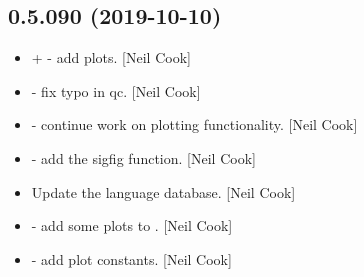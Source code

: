 \documentclass[a4paper,10pt,english]{report}
\begin{document}
\subsection{0.5.090 (2019-10-10)}
\label{\detokenize{misc/changelog:id53}}\begin{itemize}
\item {} 
 +  -
add plots. {[}Neil Cook{]}

\item {} 
 - fix typo in qc. {[}Neil Cook{]}

\item {} 
 - continue work on plotting functionality. {[}Neil Cook{]}

\item {} 
 - add the sigfig function. {[}Neil Cook{]}

\item {} 
Update the language database. {[}Neil Cook{]}

\item {} 
 - add some plots to
. {[}Neil Cook{]}

\item {} 
 - add plot constants. {[}Neil
Cook{]}

\end{itemize}
\end{document}
